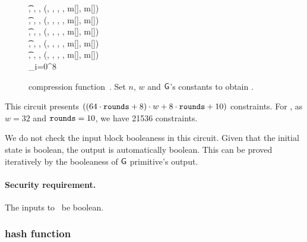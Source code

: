 \begin{figure*}[h!]
{    \t {}, , ,  \gets \blakeG(, , , , \hphantom{1} m[\tau[6]], \hphantom{1} m[\tau[7]]) \\
    \t {}, , ,  \gets \blakeG(, , , , \hphantom{1} m[\tau[8]], \hphantom{1} m[\tau[9]]) \\
    \t {}, , ,  \gets \blakeG(, , , , m[\tau[10]], m[\tau[11]]) \\
    \t {}, , \hphantom{1} ,  \gets \blakeG(, , \hphantom{1} , , m[\tau[12]], m[\tau[13]]) \\
    \t {}, , \hphantom{1} ,  \gets \blakeG(, , \hphantom{1} , , m[\tau[14]], m[\tau[15]]) \\
    \pcreturn \concat_{i=0}^8  \xor {} \xor {}
  }
  \caption{ compression function~\cite[Section 3.2]{blakecompietf}. Set $n$, $w$ and $\mathsf{G}$'s constants to obtain .}\label{implementation:alg:blake2s_comp}
\end{figure*}

This circuit presents $((64 \cdot \mathtt{rounds} + 8) \cdot w + 8 \cdot \mathtt{rounds} + 10)$ constraints. For , as $w=32$ and $\mathtt{rounds}=10$, we have 21536 constraints.

We do not check the input block booleaness in this circuit. Given that the initial state is boolean, the output is automatically boolean. This can be proved iteratively by the booleaness of $\mathsf{G}$ primitive's output.

\paragraph*{Security requirement.}  The inputs to  \MUST~be boolean.

\subsubsection{ hash function}\label{implementation:efficiency:blake:hash-circuit}

